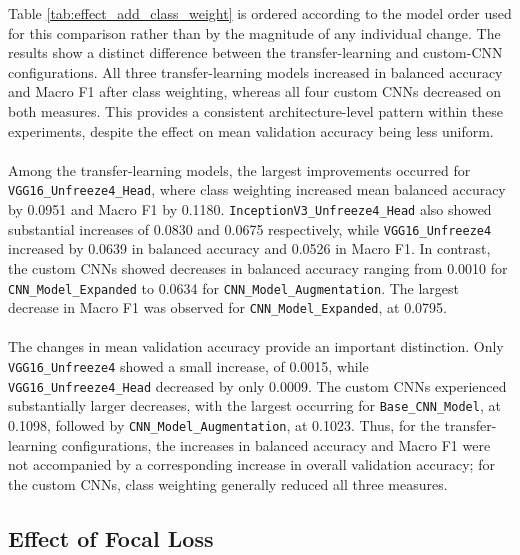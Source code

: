 \documentclass[12pt, a4paper]{report}
\let\oldsubsection\subsection
\renewcommand{\subsection}{%
    \Needspace{6\baselineskip}%
    \oldsubsection
}
\begin{document}
				Table \ref{tab:effect_add_class_weight} is ordered according to the model order used for this comparison rather than by the magnitude of any individual change. The results show a distinct difference between the transfer-learning and custom-CNN configurations. All three transfer-learning models increased in balanced accuracy and Macro F1 after class weighting, whereas all four custom CNNs decreased on both measures. This provides a consistent architecture-level pattern within these experiments, despite the effect on mean validation accuracy being less uniform.\\\\
				Among the transfer-learning models, the largest improvements occurred for \\\texttt{VGG16\_Unfreeze4\_Head}, where class weighting increased mean balanced accuracy by 0.0951 and Macro F1 by 0.1180. \texttt{InceptionV3\_Unfreeze4\_Head} also showed substantial increases of 0.0830 and 0.0675 respectively, while \texttt{VGG16\_Unfreeze4} increased by 0.0639 in balanced accuracy and 0.0526 in Macro F1. In contrast, the custom CNNs showed decreases in balanced accuracy ranging from 0.0010 for \texttt{CNN\_Model\_Expanded} to 0.0634 for \texttt{CNN\_Model\_Augmentation}. The largest decrease in Macro F1 was observed for \texttt{CNN\_Model\_Expanded}, at 0.0795.\\\\
				The changes in mean validation accuracy provide an important distinction. Only \texttt{VGG16\_Unfreeze4} showed a small increase, of 0.0015, while \texttt{VGG16\_Unfreeze4\_Head} decreased by only 0.0009. The custom CNNs experienced substantially larger decreases, with the largest occurring for \texttt{Base\_CNN\_Model}, at 0.1098, followed by \texttt{CNN\_Model\_Augmentation}, at 0.1023. Thus, for the transfer-learning configurations, the increases in balanced accuracy and Macro F1 were not accompanied by a corresponding increase in overall validation accuracy; for the custom CNNs, class weighting generally reduced all three measures.
				
			\subsection{Effect of Focal Loss}
				
\end{document}

